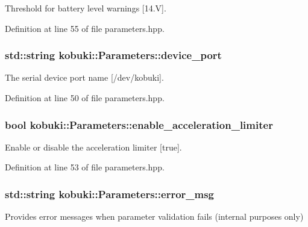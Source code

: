 \-Threshold for battery level warnings [14.\-V]. 



\-Definition at line 55 of file parameters.\-hpp.

\subsubsection[{device\-\_\-port}]{\setlength{\rightskip}{0pt plus 5cm}std\-::string {\bf kobuki\-::\-Parameters\-::device\-\_\-port}}\label{classkobuki_1_1Parameters_a993217236ea68f063f5bc285414408e2}


\-The serial device port name [/dev/kobuki]. 



\-Definition at line 50 of file parameters.\-hpp.

\subsubsection[{enable\-\_\-acceleration\-\_\-limiter}]{\setlength{\rightskip}{0pt plus 5cm}bool {\bf kobuki\-::\-Parameters\-::enable\-\_\-acceleration\-\_\-limiter}}\label{classkobuki_1_1Parameters_ab6eaa092677b34a152c9a11dfd3ff56f}


\-Enable or disable the acceleration limiter [true]. 



\-Definition at line 53 of file parameters.\-hpp.

\subsubsection[{error\-\_\-msg}]{\setlength{\rightskip}{0pt plus 5cm}std\-::string {\bf kobuki\-::\-Parameters\-::error\-\_\-msg}}\label{classkobuki_1_1Parameters_a173dfe128efc68e860cdd0b3193dc2d7}


\-Provides error messages when parameter validation fails (internal purposes only) 



